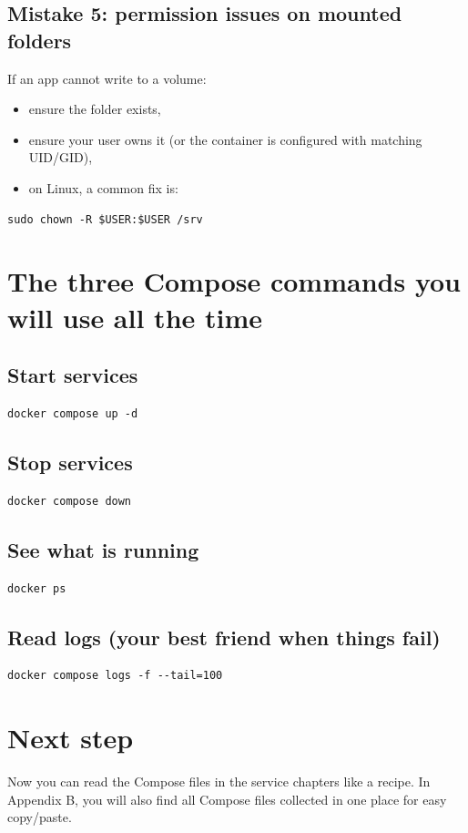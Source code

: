 \subsection{Mistake 5: permission issues on mounted folders}
If an app cannot write to a volume:
\begin{itemize}[leftmargin=*]
  \item ensure the folder exists,
  \item ensure your user owns it (or the container is configured with matching UID/GID),
  \item on Linux, a common fix is:
\end{itemize}

\begin{lstlisting}
sudo chown -R $USER:$USER /srv
\end{lstlisting}

\section{The three Compose commands you will use all the time}
\subsection*{Start services}
\begin{lstlisting}
docker compose up -d
\end{lstlisting}

\subsection*{Stop services}
\begin{lstlisting}
docker compose down
\end{lstlisting}

\subsection*{See what is running}
\begin{lstlisting}
docker ps
\end{lstlisting}

\subsection*{Read logs (your best friend when things fail)}
\begin{lstlisting}
docker compose logs -f --tail=100
\end{lstlisting}


\section{Next step}
Now you can read the Compose files in the service chapters like a recipe.
In Appendix B, you will also find all Compose files collected in one place for easy copy/paste. 